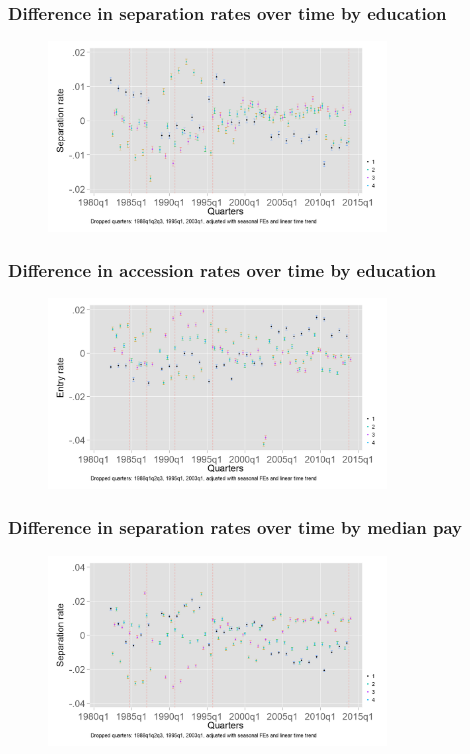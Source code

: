 \documentclass[aspectratio=169]{beamer}
\begin{document}
\begin{frame}
    \frametitle{Difference in separation rates over time by education}

    \begin{figure}[]
        \centering
        \includegraphics[width=0.8\textwidth]{../output/separation_rate_educ.png}
    \end{figure}

\end{frame}

\begin{frame}
    \frametitle{Difference in accession rates over time by education}

    \begin{figure}[]
        \centering
        \includegraphics[width=0.8\textwidth]{../output/accession_rate_educ.png}
    \end{figure}

\end{frame}

\begin{frame}
    \frametitle{Difference in separation rates over time by median pay}

    \begin{figure}[]
        \centering
        \includegraphics[width=0.8\textwidth]{../output/separation_rate_med_pay.png}
    \end{figure}

\end{frame}
\end{document}
